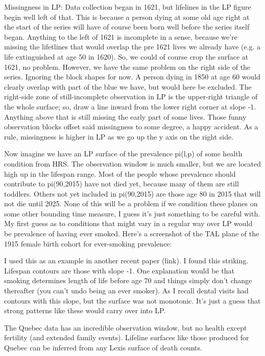 \begin{small}
Missingness in LP:
Data collection began in 1621, but lifelines in the LP figure begin well left of that. This is because a person dying at some old age right at the start of the series will have of course been born well before the series itself began. Anything to the left of 1621 is incomplete in a sense, because we're missing the lifetlines that would overlap the pre 1621 lives we already have (e.g. a life extinguished at age 50 in 1620). So, we could of course crop the surface at 1621, no problem. However, we have the same problem on the right side of the series. Ignoring the block shapes for now.  A person dying in 1850 at age 60 would clearly overlap with part of the blue we have, but would here be excluded. The right-side zone of still-incomplete observation in LP is the upper-right triangle of the whole surface; so, draw a line inward from the lower right corner at slope -1. Anything above that is still missing the early part of some lives. Those funny observation blocks offset said missingness to some degree, a happy accident. As a rule, missingness is higher in LP as we go up the y axis on the right side.

Now imagine we have an LP surface of the prevalence pi(l,p) of some health condition from HRS. The observation window is much smaller, but we are located high up in the lifespan range. Most of the people whose prevalence should contribute to  pi(90,2015) have not died yet, because many of them are still toddlers. Others not yet included in  pi(90,2015) are those age 80 in 2015 that will not die until 2025. None of this will be a problem if we condition these planes on some other bounding time measure, I guess it's just something to be careful with. My first guess as to conditions that might vary in a regular way over LP would be prevalence of having ever smoked. Here's a screenshot of the TAL plane of the 1915 female birth cohort for ever-smoking prevalence:

I used this as an example in another recent paper (link). I found this striking.
 Lifespan contours are those with slope -1. One explanation would be that smoking determines length of life before age 70 and things simply don't change thereafter (you can't undo being an ever smoker). As I recall dental visits had contours with this slope, but the surface was not monotonic. It's just a guess that strong patterns like these would carry over into LP.

The Quebec data has an incredible observation window, but no health except fertility (and extended family events). Lifeline surfaces like those produced for Quebec can be inferred from any Lexis surface of death counts.
\end{small}

